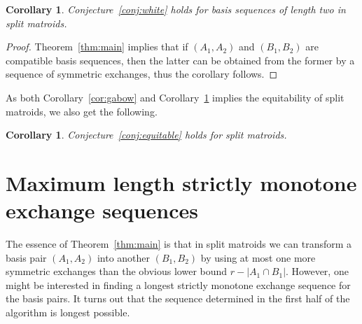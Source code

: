 \documentclass[11pt,a4paper]{article}
\theoremstyle{plain}
\newtheorem{cor}[thm]{Corollary}
\theoremstyle{definition}
\begin{document}
\begin{cor}\label{cor:white}
Conjecture~\ref{conj:white} holds for basis sequences of length two in split matroids.
\end{cor}
\begin{proof}
Theorem~\ref{thm:main} implies that if $(A_1,A_2)$ and $(B_1,B_2)$ are compatible basis sequences, then the latter can be obtained from the former by a sequence of symmetric exchanges, thus the corollary follows.
\end{proof} 

As both Corollary~\ref{cor:gabow} and Corollary~\ref{cor:white} implies the equitability of split matroids, we also get the following. 

\begin{cor}\label{cor:equitable}
Conjecture~\ref{conj:equitable} holds for split matroids.
\end{cor}


\section{Maximum length strictly monotone exchange sequences}
\label{sec:monotone}

The essence of Theorem~\ref{thm:main} is that in split matroids we can transform a basis pair $(A_1,A_2)$ into another $(B_1,B_2)$ by using at most one more symmetric exchanges than the obvious lower bound $r-|A_1\cap B_1|$. However, one might be interested in finding a longest strictly monotone exchange sequence for the basis pairs. It turns out that the sequence determined in the first half of the algorithm is longest possible.
\end{document}
